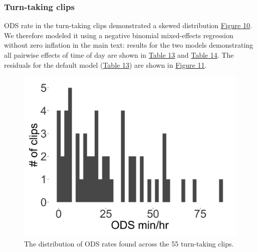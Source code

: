 \documentclass[,man,floatsintext]{apa6}
\begin{document}
\FloatBarrier

\subsubsection{Turn-taking clips}\label{models-ods-turntaking}

ODS rate in the turn-taking clips demonstrated a skewed distribution
\protect\hyperlink{fig10}{Figure 10}. We therefore modeled it using a
negative binomial mixed-effects regression without zero inflation in the
main text: results for the two models demonstrating all pairwise effects
of time of day are shown in \protect\hyperlink{tab13}{Table 13} and
\protect\hyperlink{tab14}{Table 14}. The residuals for the default model
(\protect\hyperlink{tab13}{Table 13}) are shown in
\protect\hyperlink{fig11}{Figure 11}.

\FloatBarrier

\begin{figure}[H]

{\centering \includegraphics[width=0.4\linewidth]{www/ODS_turntaking_distribution} 

}

\caption{The distribution of ODS rates found across the 55 turn-taking clips.}\label{fig:fig10}
\end{figure}

\FloatBarrier
\end{document}
